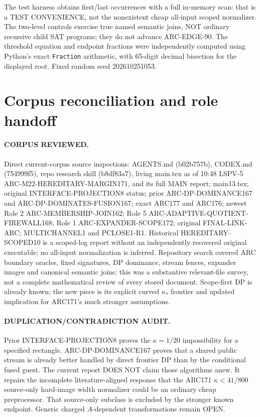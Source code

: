 \documentclass[11pt]{article}
\begin{document}
The test harness obtains first/last occurrences with a full in-memory scan:
that is a TEST CONVENIENCE, not the nonexistent cheap all-input scoped
normalizer. The two-level controls exercise true named semantic joins, NOT
ordinary recursive child SAT programs; they do not advance ARC-EDGE-90.
The threshold equation and endpoint fractions were independently computed
using Python's exact \texttt{Fraction} arithmetic, with 65-digit decimal
bisection for the displayed root. Fixed random seed 202610251053.

\section{Corpus reconciliation and role handoff}
\paragraph{CORPUS REVIEWED.}
Direct current-corpus source inspections: AGENTS.md (b02b757b), CODEX.md
(754999f5), repo research skill (b8df83a7), living main.tex as of
10:48 LSPV-5 ARC-M22-HEREDITARY-MARGIN171, and its full MAIN report;
main13.tex; original INTERFACE-PROJECTION8 status; prior
ARC-DP-DOMINANCE167 and ARC-DP-DOMINATES-FUSION167; exact
ARC177 and ARC176; newest Role 2 ARC-MEMBERSHIP-JOIN162;
Role 5 ARC-ADAPTIVE-QUOTIENT-FIREWALL168; Role 1 ARC-EXPANDER-SCOPE172;
original FINAL-LINK-ARC; MULTICHANNEL1 and PCLOSE1-R1. Historical
HEREDITARY-SCOPED10 is a scoped-log report without an independently
recovered original executable; no all-input normalization is inferred.
Repository search covered ARC boundary oracles, fixed signatures,
DP dominance, stream fences, expander images and canonical semantic joins;
this was a substantive relevant-file survey, not a complete mathematical
review of every stored document. Scope-first DP is already known; the new
piece is its explicit curved $\kappa_*$ frontier and updated implication
for ARC171's much stronger assumptions.

\paragraph{DUPLICATION/CONTRADICTION AUDIT.}
Prior INTERFACE-PROJECTION8 proves the $\kappa=1/20$ impossibility for a
specified rectangle. ARC-DP-DOMINANCE167 proves that a shared public stream
is already better handled by direct frontier DP than by the conditional
fused guest. The current report DOES NOT claim those algorithms anew. It
repairs the incomplete literature-aligned response that the ARC171
$\kappa<41/800$ source-only hard-image width normalizer could be an
ordinary cheap preprocessor. That source-only subclass is excluded by the
stronger known endpoint. Generic charged $A$-dependent transformations
remain OPEN.
\end{document}
